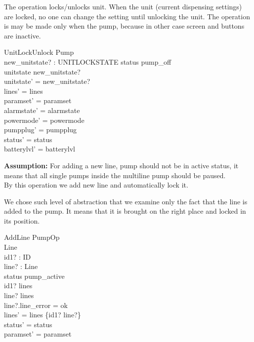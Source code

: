 \documentclass{article}
\begin{document}
	
		The operation locks/unlocks unit. When the unit (current dispensing settings) are locked, no one can change the setting until unlocking the unit. The operation is may be made only when the pump, because in other case screen and buttons are inactive.\\
    \begin{schema}{UnitLockUnlock}
		\Delta Pump \\
		new\_unitstate? : UNITLOCKSTATE
	\where
		status \neq pump\_off \\ 
		unitstate \neq new\_unitstate? \\
		unitstate' = new\_unitstate? \\
    	lines' = lines  \\
    	paramset' = paramset\\
    	alarmstate' = alarmstate \\
    	powermode' = powermode \\
    	pumpplug' = pumpplug \\
    	status' = status \\	
    	batterylvl' = batterylvl\\
	\end{schema}


		\textbf{Assumption:} For adding a new line, pump should not be in active status, it means that all single pumps inside the multiline pump should be paused.\\
		By this operation we add new line and automatically lock it.

We chose such level of abstraction that we examine only the fact that the line is added to the pump. It means that it is brought on the right place and locked in its position.

    \begin{schema}{AddLine}
    	PumpOp\\
		\Xi Line \\
		id1? : ID \\
		line? : Line \\
	\where
	    status \neq pump\_active \\
		id1? \notin \dom lines \\
		line? \notin \ran lines \\
		line?.line\_error = ok\\
    	lines' = lines \cup \{id1? \mapsto line?\} \\
    	status' = status \\
    	paramset' = paramset\\
	\end{schema}
\end{document}
